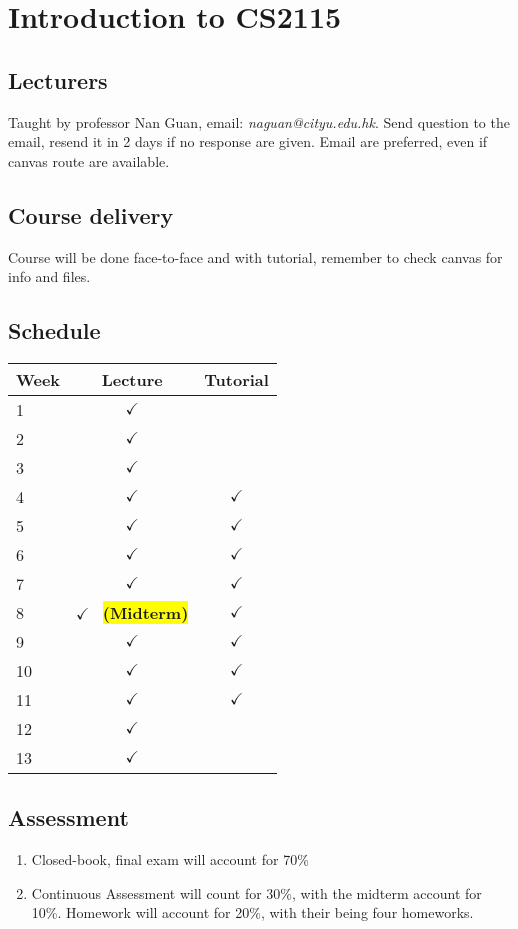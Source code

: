 \chapter{Introduction to CS2115}

\section{Lecturers}
Taught by professor Nan Guan, email: \emph{naguan@cityu.edu.hk}. Send question to the email, resend it in 2 days if no response are given. Email are preferred, even if canvas route are available. 

\section{Course delivery}

Course will be done face-to-face and with tutorial, remember to check canvas for info and files. 

\section{Schedule}


\begin{tabular}{@{}lcc@{}}
\toprule
\textbf{Week} & \textbf{Lecture} & \textbf{Tutorial}\\
\midrule
1  & $\checkmark$ & \\
2  & $\checkmark$ & \\
3  & $\checkmark$ & \\
4  & $\checkmark$ & $\checkmark$\\
5  & $\checkmark$ & $\checkmark$\\
6  & $\checkmark$ & $\checkmark$\\
7  & $\checkmark$ & $\checkmark$\\
8  & $\checkmark$ \ \colorbox{yellow}{\textbf{(Midterm)}} & $\checkmark$\\
9  & $\checkmark$ & $\checkmark$\\
10 & $\checkmark$ & $\checkmark$\\
11 & $\checkmark$ & $\checkmark$\\
12 & $\checkmark$ & \\
13 & $\checkmark$ & \\
\bottomrule
\end{tabular}


\section{Assessment}
\begin{enumerate}
    \item Closed-book, final exam will account for 70\%
    \item Continuous Assessment will count for 30\%, with the midterm account for 10\%. Homework will account for 20\%, with their being four homeworks.
\end{enumerate}

